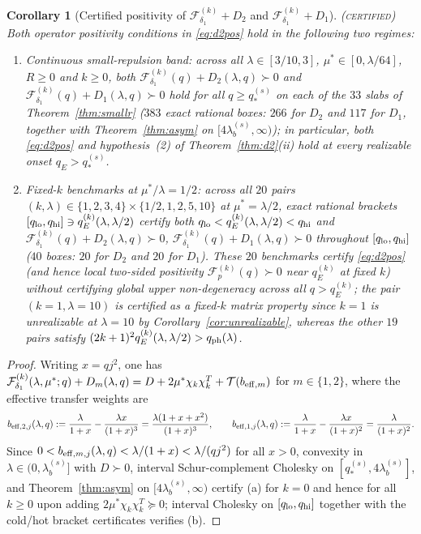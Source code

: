 \documentclass[11pt]{article}
\newcommand{\Fcal}{\mathcal F}
\newcommand{\muS}{\mu^{*}}
\newtheorem{corollary}[theorem]{Corollary}
\theoremstyle{definition}
\theoremstyle{remark}
\newcommand{\certified}{\textnormal{\textsc{(certified)}}}
\begin{document}
\begin{corollary}[Certified positivity of $\Fcal_{\delta_1}^{(k)}+D_2$ and $\Fcal_{\delta_1}^{(k)}+D_1$]
\label{cor:d2cert}\certified
Both operator positivity conditions in \eqref{eq:d2pos} hold in the following two regimes:
\begin{enumerate}[label=(\alph*),leftmargin=2.2em]
\item \emph{Continuous small-repulsion band:} across all $\lambda\in[3/10,3]$,
$\muS\in[0,\lambda/64]$, $R\ge0$ and $k\ge0$, both
$\Fcal_{\delta_1}^{(k)}(q)+D_2(\lambda,q)\succ0$ and
$\Fcal_{\delta_1}^{(k)}(q)+D_1(\lambda,q)\succ0$ hold for all $q\ge q_*^{(s)}$ on each of
the $33$ slabs of Theorem~\ref{thm:smallr} ($383$ exact rational boxes: $266$ for $D_2$ and
$117$ for $D_1$, together with Theorem~\ref{thm:asym} on $[4\lambda_b^{(s)},\infty)$); in
particular, both \eqref{eq:d2pos} and hypothesis~(2) of Theorem~\ref{thm:d2}(ii) hold at
every realizable onset $q_E>q_*^{(s)}$.
\item \emph{Fixed-$k$ benchmarks at $\muS/\lambda=1/2$:} across all $20$ pairs
$(k,\lambda)\in\{1,2,3,4\}\times\{1/2,1,2,5,10\}$ at $\muS=\lambda/2$, exact rational
brackets $[q_{\rm lo},q_{\rm hi}]\ni q_E^{(k)}(\lambda,\lambda/2)$ certify both
$q_{\rm lo}<q_E^{(k)}(\lambda,\lambda/2)<q_{\rm hi}$ and
$\Fcal_{\delta_1}^{(k)}(q)+D_2(\lambda,q)\succ0$,
$\Fcal_{\delta_1}^{(k)}(q)+D_1(\lambda,q)\succ0$ throughout $[q_{\rm lo},q_{\rm hi}]$ ($40$
boxes: $20$ for $D_2$ and $20$ for $D_1$). These $20$ benchmarks certify \eqref{eq:d2pos}
(and hence local two-sided positivity $\Fcal_p^{(k)}(q)\succ0$ near $q_E^{(k)}$ at fixed $k$)
without certifying global upper non-degeneracy across all $q>q_E^{(k)}$; the pair
$(k=1,\lambda=10)$ is certified as a fixed-$k$ matrix property since $k=1$ is unrealizable
at $\lambda=10$ by Corollary~\ref{cor:unrealizable}, whereas the other $19$ pairs satisfy
$(2k+1)^2q_E^{(k)}(\lambda,\lambda/2)>q_{\rm ph}(\lambda)$.
\end{enumerate}
\end{corollary}

\begin{proof}
Writing $x=qj^2$, one has
$\Fcal_{\delta_1}^{(k)}(\lambda,\muS;q)+D_m(\lambda,q)=D+2\muS\chi_k\chi_k^T+\mathcal T(b_{{\rm eff},m})$
for $m\in\{1,2\}$, where the effective transfer weights are
\[
b_{{\rm eff},2,j}(\lambda,q):=\frac{\lambda}{1+x}-\frac{\lambda x}{(1+x)^3}
=\frac{\lambda(1+x+x^2)}{(1+x)^3},\qquad
b_{{\rm eff},1,j}(\lambda,q):=\frac{\lambda}{1+x}-\frac{\lambda x}{(1+x)^2}
=\frac{\lambda}{(1+x)^2}.
\]
Since $0<b_{{\rm eff},m,j}(\lambda,q)<\lambda/(1+x)<\lambda/(qj^2)$ for all $x>0$,
convexity in $\lambda\in(0,\lambda_b^{(s)}]$ with $D\succ0$, interval Schur-complement
Cholesky on $[q_*^{(s)},4\lambda_b^{(s)}]$, and Theorem~\ref{thm:asym} on
$[4\lambda_b^{(s)},\infty)$ certify (a) for $k=0$ and hence for all $k\ge0$ upon adding
$2\muS\chi_k\chi_k^T\succeq0$; interval Cholesky on $[q_{\rm lo},q_{\rm hi}]$ together with
the cold/hot bracket certificates verifies (b).
\end{proof}
\end{document}
